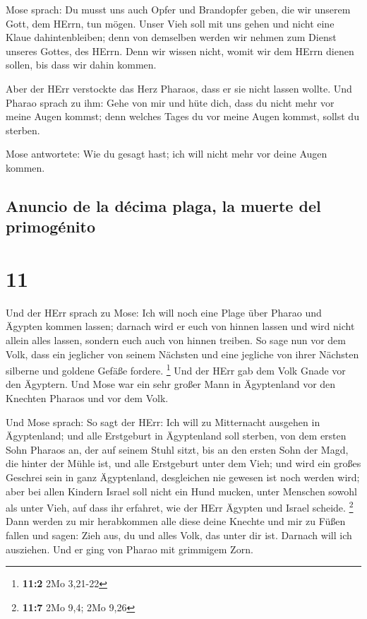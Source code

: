  Mose sprach: Du musst uns auch Opfer und Brandopfer
geben, die wir unserem Gott, dem HErrn, tun mögen.  Unser
Vieh soll mit uns gehen und nicht eine Klaue dahintenbleiben; denn von
demselben werden wir nehmen zum Dienst unseres Gottes, des HErrn. Denn
wir wissen nicht, womit wir dem HErrn dienen sollen, bis dass wir dahin
kommen.

 Aber der HErr verstockte das Herz Pharaos, dass er sie
nicht lassen wollte.  Und Pharao sprach zu ihm: Gehe von
mir und hüte dich, dass du nicht mehr vor meine Augen kommst; denn
welches Tages du vor meine Augen kommst, sollst du sterben.

 Mose antwortete: Wie du gesagt hast; ich will nicht mehr
vor deine Augen kommen.

\hypertarget{anuncio-de-la-duxe9cima-plaga-la-muerte-del-primoguxe9nito}{%
\subsection{Anuncio de la décima plaga, la muerte del
primogénito}\label{anuncio-de-la-duxe9cima-plaga-la-muerte-del-primoguxe9nito}}

\hypertarget{section-10}{%
\section{11}\label{section-10}}

 Und der HErr sprach zu Mose: Ich will noch eine Plage
über Pharao und Ägypten kommen lassen; darnach wird er euch von hinnen
lassen und wird nicht allein alles lassen, sondern euch auch von hinnen
treiben.  So sage nun vor dem Volk, dass ein jeglicher von
seinem Nächsten und eine jegliche von ihrer Nächsten silberne und
goldene Gefäße fordere. \footnote{\textbf{11:2} 2Mo 3,21-22}
 Und der HErr gab dem Volk Gnade vor den Ägyptern. Und
Mose war ein sehr großer Mann in Ägyptenland vor den Knechten Pharaos
und vor dem Volk.

 Und Mose sprach: So sagt der HErr: Ich will zu
Mitternacht ausgehen in Ägyptenland;  und alle Erstgeburt
in Ägyptenland soll sterben, von dem ersten Sohn Pharaos an, der auf
seinem Stuhl sitzt, bis an den ersten Sohn der Magd, die hinter der
Mühle ist, und alle Erstgeburt unter dem Vieh;  und wird
ein großes Geschrei sein in ganz Ägyptenland, desgleichen nie gewesen
ist noch werden wird;  aber bei allen Kindern Israel soll
nicht ein Hund mucken, unter Menschen sowohl als unter Vieh, auf dass
ihr erfahret, wie der HErr Ägypten und Israel scheide. \footnote{\textbf{11:7}
  2Mo 9,4; 2Mo 9,26}  Dann werden zu mir herabkommen alle
diese deine Knechte und mir zu Füßen fallen und sagen: Zieh aus, du und
alles Volk, das unter dir ist. Darnach will ich ausziehen. Und er ging
von Pharao mit grimmigem Zorn.

